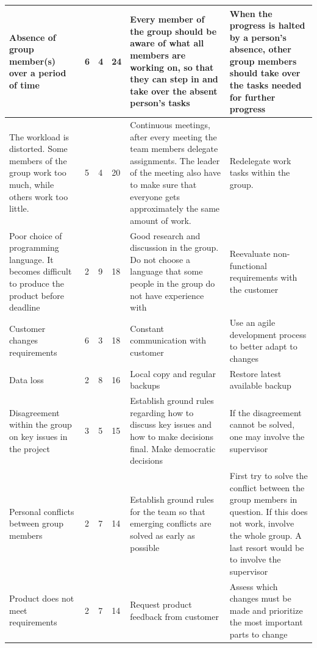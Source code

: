 \begin{appendices}
\begin{longtable}{ | p{4.5cm} | p{1cm} | p{1cm} | p{1cm} | p{4.5cm} | p{4.5cm} |}
	Absence of group member(s) over a period of time & 6 & 4 & 24 & Every member of the group should be aware of what all members are working on, so that they can step in and take over the absent person's tasks & When the progress is halted by a person's absence, other group members should take over the tasks needed for further progress \\ \hline
	
	The workload is distorted. Some members of the group work too much, while others work too little. & 5 & 4 & 20 & Continuous meetings, after every meeting the team members delegate assignments. The leader of the meeting also have to make sure that everyone gets approximately the same amount of work. & Redelegate work tasks within the group. \\ \hline
	
	Poor choice of programming language. It becomes difficult to produce the product before deadline & 2 & 9 & 18 & Good research and discussion in the group. Do not choose a language that some people in the group do not have experience with & Reevaluate non-functional requirements with the customer \\ \hline
	
	Customer changes requirements & 6 & 3 & 18 & Constant communication with customer & Use an agile development process to better adapt to changes \\ \hline
	
	Data loss & 2 & 8 & 16 & Local copy and regular backups & Restore latest available backup \\ \hline
	
	Disagreement within the group on key issues in the project & 3 & 5 & 15 & Establish ground rules regarding how to discuss key issues and how to make decisions final. Make democratic decisions & If the disagreement cannot be solved, one may involve the supervisor \\ \hline
	
	Personal conflicts between group members & 2 & 7 & 14 & Establish ground rules for the team so that emerging conflicts are solved as early as possible & First try to solve the conflict between the group members in question. If this does not work, involve the whole group. A last resort would be to involve the supervisor \\ \hline
	
	Product does not meet requirements & 2 & 7 & 14 & Request product feedback from customer & Assess which changes must be made and prioritize the most important parts to change \\ \hline
	

\end{longtable}
\end{appendices}
